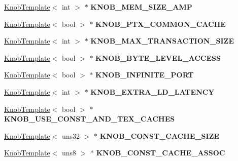 \begin{DoxyCompactItemize}
\item 
\hypertarget{classall__knobs__c_a14507b75c0ac08b8bd7d4682c98a2043}{
\hyperlink{classKnobTemplate}{KnobTemplate}$<$ int $>$ $\ast$ {\bfseries KNOB\_\-MEM\_\-SIZE\_\-AMP}}
\label{classall__knobs__c_a14507b75c0ac08b8bd7d4682c98a2043}

\item 
\hypertarget{classall__knobs__c_a3b1bc4514ebe29dd57681e5343d4ed0c}{
\hyperlink{classKnobTemplate}{KnobTemplate}$<$ bool $>$ $\ast$ {\bfseries KNOB\_\-PTX\_\-COMMON\_\-CACHE}}
\label{classall__knobs__c_a3b1bc4514ebe29dd57681e5343d4ed0c}

\item 
\hypertarget{classall__knobs__c_abb6e8e39a81b255203594bc9df4f1537}{
\hyperlink{classKnobTemplate}{KnobTemplate}$<$ int $>$ $\ast$ {\bfseries KNOB\_\-MAX\_\-TRANSACTION\_\-SIZE}}
\label{classall__knobs__c_abb6e8e39a81b255203594bc9df4f1537}

\item 
\hypertarget{classall__knobs__c_af05e557a5e9b5a351036c6e15b58be0b}{
\hyperlink{classKnobTemplate}{KnobTemplate}$<$ bool $>$ $\ast$ {\bfseries KNOB\_\-BYTE\_\-LEVEL\_\-ACCESS}}
\label{classall__knobs__c_af05e557a5e9b5a351036c6e15b58be0b}

\item 
\hypertarget{classall__knobs__c_a592beb15fd5e23039bf20dc695bbeb9d}{
\hyperlink{classKnobTemplate}{KnobTemplate}$<$ bool $>$ $\ast$ {\bfseries KNOB\_\-INFINITE\_\-PORT}}
\label{classall__knobs__c_a592beb15fd5e23039bf20dc695bbeb9d}

\item 
\hypertarget{classall__knobs__c_acde9288b346e53234b15de8eff1dd36b}{
\hyperlink{classKnobTemplate}{KnobTemplate}$<$ int $>$ $\ast$ {\bfseries KNOB\_\-EXTRA\_\-LD\_\-LATENCY}}
\label{classall__knobs__c_acde9288b346e53234b15de8eff1dd36b}

\item 
\hypertarget{classall__knobs__c_aa68be1c29cc37753a4a11b77fe6f660c}{
\hyperlink{classKnobTemplate}{KnobTemplate}$<$ bool $>$ $\ast$ {\bfseries KNOB\_\-USE\_\-CONST\_\-AND\_\-TEX\_\-CACHES}}
\label{classall__knobs__c_aa68be1c29cc37753a4a11b77fe6f660c}

\item 
\hypertarget{classall__knobs__c_a1eb6e97d07cca5ef60048a6281436d7f}{
\hyperlink{classKnobTemplate}{KnobTemplate}$<$ uns32 $>$ $\ast$ {\bfseries KNOB\_\-CONST\_\-CACHE\_\-SIZE}}
\label{classall__knobs__c_a1eb6e97d07cca5ef60048a6281436d7f}

\item 
\hypertarget{classall__knobs__c_a2242ce411ab8199f484aab9678066a80}{
\hyperlink{classKnobTemplate}{KnobTemplate}$<$ uns8 $>$ $\ast$ {\bfseries KNOB\_\-CONST\_\-CACHE\_\-ASSOC}}
\label{classall__knobs__c_a2242ce411ab8199f484aab9678066a80}


\end{DoxyCompactItemize}
